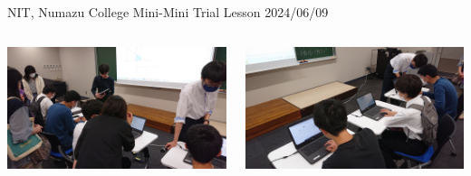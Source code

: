 \documentclass[dvipdfmx, unicode, 169]{beamer}
\begin{document}
\begin{frame}{NIT, Numazu College Mini-Mini Trial Lesson 2024/06/09}
  \begin{columns}[T]
    \begin{column}{0.5\linewidth}
      \includegraphics[width=\linewidth]{img/ActiveReport/20240609_minimini1.jpg}
    \end{column}
    \begin{column}{0.5\linewidth}
      \includegraphics[width=\linewidth]{img/ActiveReport/20240609_minimini2.jpg}
    \end{column}
  \end{columns}
\end{frame}
\end{document}
